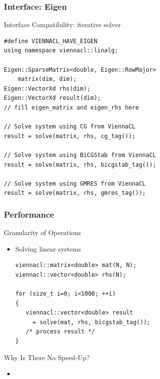 \begin{frame}[fragile]
\frametitle{Interface: Eigen}
\begin{block}{Interface Compatibility: iterative solver}
  \begin{lstlisting}
#define VIENNACL_HAVE_EIGEN
using namespace viennacl::linalg;
 
Eigen::SparseMatrix<double, Eigen::RowMajor>
    matrix(dim, dim);
Eigen::VectorXd rhs(dim);
Eigen::VectorXd result(dim);
// fill eigen_matrix and eigen_rhs here
 
// Solve system using CG from ViennaCL
result = solve(matrix, rhs, cg_tag());
 
// Solve system using BiCGStab from ViennaCL
result = solve(matrix, rhs, bicgstab_tag());
 
// Solve system using GMRES from ViennaCL
result = solve(matrix, rhs, gmres_tag());
  \end{lstlisting} 
\end{block}

\end{frame}







\begin{frame}[fragile]
\frametitle{Performance}
 \begin{block}{Granularity of Operations}
  \begin{itemize}
   \item Solving linear systems
   \begin{lstlisting}
viennacl::matrix<double> mat(N, N);
viennacl::vector<double> rhs(N);

for (size_t i=0; i<1000; ++i)
{
   viennacl::vector<double> result 
     = solve(mat, rhs, bicgstab_tag());
   /* process result */
}
   \end{lstlisting}
  \end{itemize}
 \end{block}

 \begin{block}{Why Is There No Speed-Up?}
   \begin{itemize}
    \item 
   \end{itemize}
 \end{block}

\end{frame}


